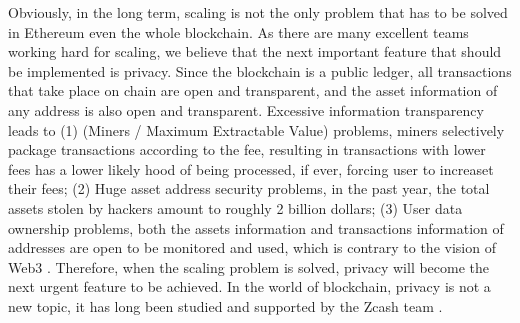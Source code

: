 Obviously, in the long term, scaling is not the only problem that has to be solved in Ethereum even the whole blockchain. As there are many excellent teams working hard for scaling, we believe that the next important feature that should be implemented is privacy. Since the blockchain is a public ledger, all transactions that take place on chain are open and transparent, and the asset information of any address is also open and transparent. Excessive information transparency leads to (1)  (Miners / Maximum Extractable Value) problems, miners selectively package transactions according to the fee, resulting in transactions with lower fees has a lower likely hood of being processed, if ever, forcing user to increaset their fees; (2) Huge asset address security problems, in the past year, the total assets stolen by hackers amount to roughly 2 billion dollars; (3) User data ownership problems, both the assets information and transactions information of addresses are open to be monitored and used, which is contrary to the vision of Web3 \cite{website:Web3}. Therefore, when the scaling problem is solved, privacy will become the next urgent feature to be achieved. In the world of blockchain, privacy is not a new topic, it has long been studied and supported by the Zcash team \cite{website:Zcash}.






